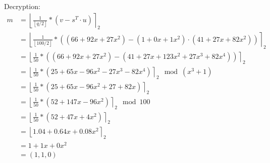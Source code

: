 Decryption:
\begin{align*}
  m & = \left\lfloor \frac{1}{\left\lfloor q/2\right\rfloor}*(v-s^T \cdot u)\right\rceil _2                                               \\
    & = \left\lfloor \frac{1}{\left\lfloor 100/2\right\rfloor}*((66 + 92x + 27x^2 )- (1 + 0x + 1x^2) \cdot (41+27x+82x^2))\right\rceil _2 \\
    & = \left\lfloor \frac{1}{50}*((66 + 92x + 27x^2 )- (41 + 27x + 123x^2 + 27x^3 + 82x^4))\right\rceil _2                               \\
    & = \left\lfloor \frac{1}{50}*(25 + 65x - 96x^2 - 27x^3 - 82x^4)\right\rceil _2 \mod (x^3+1)                                          \\
    & = \left\lfloor \frac{1}{50}*(25 + 65x - 96x^2 + 27 + 82x)\right\rceil _2                                                            \\
    & = \left\lfloor \frac{1}{50}*(52+147x-96x^2)\right\rceil _2 \mod 100                                                                 \\
    & = \left\lfloor \frac{1}{50}*(52+47x+4x^2)\right\rceil _2                                                                            \\
    & = \left\lfloor 1.04 + 0.64x + 0.08x^2\right\rceil _2                                                                                \\
    & = 1 + 1x + 0x^2                                                                                                                     \\
    &= (1, 1, 0)
\end{align*}
